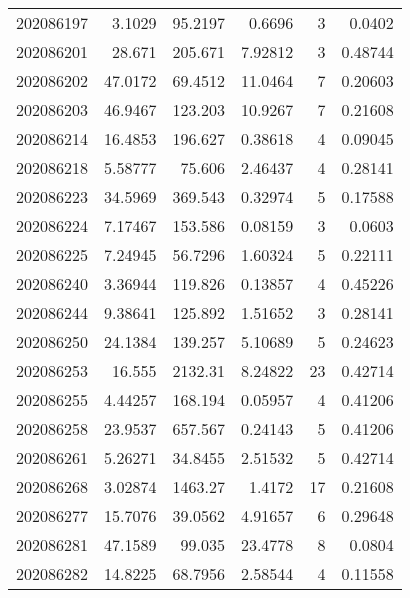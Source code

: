 \begin{tabular}{rrrrrr}
 202086197 &          3.1029  &       95.2197 &            0.6696  &           3 & 0.0402  \\
 202086201 &         28.671   &      205.671  &            7.92812 &           3 & 0.48744 \\
 202086202 &         47.0172  &       69.4512 &           11.0464  &           7 & 0.20603 \\
 202086203 &         46.9467  &      123.203  &           10.9267  &           7 & 0.21608 \\
 202086214 &         16.4853  &      196.627  &            0.38618 &           4 & 0.09045 \\
 202086218 &          5.58777 &       75.606  &            2.46437 &           4 & 0.28141 \\
 202086223 &         34.5969  &      369.543  &            0.32974 &           5 & 0.17588 \\
 202086224 &          7.17467 &      153.586  &            0.08159 &           3 & 0.0603  \\
 202086225 &          7.24945 &       56.7296 &            1.60324 &           5 & 0.22111 \\
 202086240 &          3.36944 &      119.826  &            0.13857 &           4 & 0.45226 \\
 202086244 &          9.38641 &      125.892  &            1.51652 &           3 & 0.28141 \\
 202086250 &         24.1384  &      139.257  &            5.10689 &           5 & 0.24623 \\
 202086253 &         16.555   &     2132.31   &            8.24822 &          23 & 0.42714 \\
 202086255 &          4.44257 &      168.194  &            0.05957 &           4 & 0.41206 \\
 202086258 &         23.9537  &      657.567  &            0.24143 &           5 & 0.41206 \\
 202086261 &          5.26271 &       34.8455 &            2.51532 &           5 & 0.42714 \\
 202086268 &          3.02874 &     1463.27   &            1.4172  &          17 & 0.21608 \\
 202086277 &         15.7076  &       39.0562 &            4.91657 &           6 & 0.29648 \\
 202086281 &         47.1589  &       99.035  &           23.4778  &           8 & 0.0804  \\
 202086282 &         14.8225  &       68.7956 &            2.58544 &           4 & 0.11558 \\

\end{tabular}
